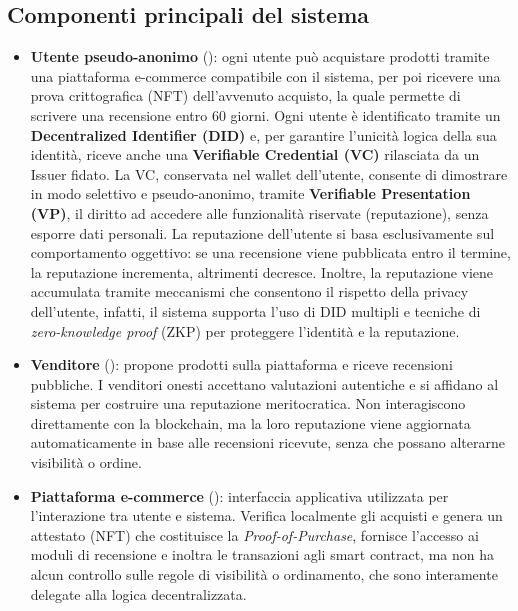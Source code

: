         \subsection{Componenti principali del sistema}
            \begin{itemize}
                \item \textbf{Utente pseudo-anonimo} (\faUserSecret): ogni utente può acquistare prodotti tramite una piattaforma e-commerce compatibile con il sistema, per poi ricevere una prova crittografica (NFT) dell'avvenuto acquisto, la quale permette di scrivere una recensione entro 60 giorni.
                Ogni utente è identificato tramite un \textbf{Decentralized Identifier (DID)} e, per garantire l'unicità logica della sua identità, riceve anche una \textbf{Verifiable Credential (VC)} rilasciata da un Issuer fidato.
                La VC, conservata nel wallet dell'utente, consente di dimostrare in modo selettivo e pseudo-anonimo, tramite \textbf{Verifiable Presentation (VP)}, il diritto ad accedere alle funzionalità riservate (reputazione), senza esporre dati personali.
                La reputazione dell'utente si basa esclusivamente sul comportamento oggettivo: se una recensione viene pubblicata entro il termine, la reputazione incrementa, altrimenti decresce.
                Inoltre, la reputazione viene accumulata tramite meccanismi che consentono il rispetto della privacy dell'utente, infatti, il sistema supporta l'uso di DID multipli e tecniche di \textit{zero-knowledge proof} (ZKP) per proteggere l'identità e la reputazione.
            
                \item \textbf{Venditore} (\faShoppingBag): propone prodotti sulla piattaforma e riceve recensioni pubbliche. I venditori onesti accettano valutazioni autentiche e si affidano al sistema per costruire una reputazione meritocratica. Non interagiscono direttamente con la blockchain, ma la loro reputazione viene aggiornata automaticamente in base alle recensioni ricevute, senza che possano alterarne visibilità o ordine.
            
                \item \textbf{Piattaforma e-commerce} (\faShoppingCart): interfaccia applicativa utilizzata per l'interazione tra utente e sistema. Verifica localmente gli acquisti e genera un attestato (NFT) che costituisce la \textit{Proof-of-Purchase}, fornisce l'accesso ai moduli di recensione e inoltra le transazioni agli smart contract, ma non ha alcun controllo sulle regole di visibilità o ordinamento, che sono interamente delegate alla logica decentralizzata.
            

\end{itemize}
